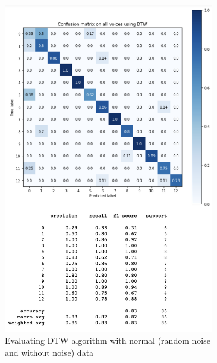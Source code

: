 \documentclass[%
  article,%
  10pt,%
  a4paper,%
  fleqn,%
  oneside,%
  sumario = tradicional,%
  chapter = TITLE,%
  section = TITLE,%
]{abntex2}
\begin{document}
\begin{figure}
\centering
\begin{minipage}[b]{.4\textwidth}
\begin{figure}[H]
  \centering
  \includegraphics[width = \columnwidth]{./Figuras/dtwall}
  \caption{Evaluating DTW algorithm with normal (random noise and without noise) data}
  \label{fig:dtwall}
\end{figure}
\end{minipage}\qquad
\begin{minipage}[b]{.4\textwidth}
\begin{figure}[H]
  \centering

\end{figure}
\end{minipage}
\end{figure}
\end{document}
